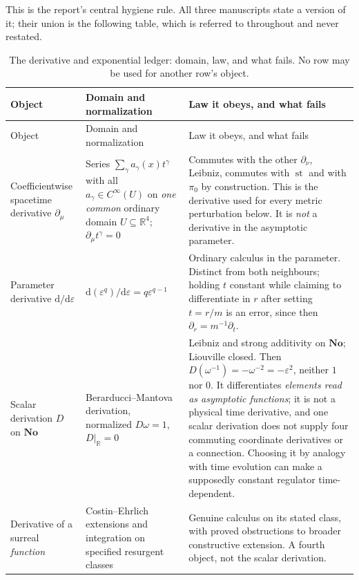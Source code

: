 \documentclass[11pt,letterpaper]{article}
\numberwithin{equation}{section}
\theoremstyle{definition}
\theoremstyle{remark}
\newcommand{\No}{\mathbf{No}}
\newcommand{\R}{\mathbb R}
\newcommand{\eps}{\varepsilon}
\DeclareMathOperator{\st}{st}
\newcommand{\dd}{\mathrm d}
\begin{document}
This is the report's central hygiene rule. All three manuscripts state a
version of it; their union is the following table, which is referred to
throughout and never restated.

\begin{longtable}{@{}L{0.20\textwidth}L{0.31\textwidth}L{0.41\textwidth}@{}}
\caption{The derivative and exponential ledger: domain, law, and what fails.
No row may be used for another row's object.}
\label{phys:tab:derivatives}\\
\toprule
Object & Domain and normalization & Law it obeys, and what fails \\
\midrule
\endfirsthead
\toprule
Object & Domain and normalization & Law it obeys, and what fails \\
\midrule
\endhead
\bottomrule
\endfoot
Coefficientwise spacetime derivative $\partial_{\mu}$ &
Series $\sum_{\gamma}a_{\gamma}(x)t^{\gamma}$ with all $a_{\gamma}\in
C^{\infty}(U)$ on \emph{one common} ordinary domain $U\subseteq\R^{4}$;
$\partial_{\mu}t^{\gamma}=0$ &
Commutes with the other $\partial_{\nu}$, Leibniz, commutes with $\st$ and with
$\pi_{0}$ by construction. This is the derivative used for every metric
perturbation below. It is \emph{not} a derivative in the asymptotic parameter.
\\
\addlinespace
Parameter derivative $\dd/\dd\eps$ &
$\dd(\eps^{q})/\dd\eps=q\eps^{q-1}$ &
Ordinary calculus in the parameter. Distinct from both neighbours; holding
$t$ constant while claiming to differentiate in $r$ after setting $t=r/m$ is
an error, since then $\partial_{r}=m^{-1}\partial_{t}$. \\
\addlinespace
Scalar derivation $D$ on $\No$ &
Berarducci--Mantova derivation, normalized $D\omega=1$, $D|_{\R}=0$
\cite{phys:BM,phys:ADH} &
Leibniz and strong additivity on $\No$; Liouville closed. Then
$D(\omega^{-1})=-\omega^{-2}=-\eps^{2}$, neither $1$ nor $0$. It
differentiates \emph{elements read as asymptotic functions}; it is not a
physical time derivative, and one scalar derivation does not supply four
commuting coordinate derivatives or a connection. Choosing it by analogy with
time evolution can make a supposedly constant regulator time-dependent. \\
\addlinespace
Derivative of a surreal \emph{function} &
Costin--Ehrlich extensions and integration on specified resurgent classes
\cite{phys:CE} &
Genuine calculus on its stated class, with proved obstructions to broader
constructive extension. A fourth object, not the scalar derivation. \\

\end{longtable}
\end{document}
